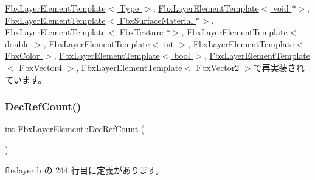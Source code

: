 \hyperlink{class_fbx_layer_element_template_a035bb7adbe8edf5a861d6154c7ebeb8b}{Fbx\+Layer\+Element\+Template$<$ Type $>$}, \hyperlink{class_fbx_layer_element_template_a035bb7adbe8edf5a861d6154c7ebeb8b}{Fbx\+Layer\+Element\+Template$<$ void $\ast$$>$}, \hyperlink{class_fbx_layer_element_template_a035bb7adbe8edf5a861d6154c7ebeb8b}{Fbx\+Layer\+Element\+Template$<$ Fbx\+Surface\+Material $\ast$$>$}, \hyperlink{class_fbx_layer_element_template_a035bb7adbe8edf5a861d6154c7ebeb8b}{Fbx\+Layer\+Element\+Template$<$ Fbx\+Texture $\ast$$>$}, \hyperlink{class_fbx_layer_element_template_a035bb7adbe8edf5a861d6154c7ebeb8b}{Fbx\+Layer\+Element\+Template$<$ double $>$}, \hyperlink{class_fbx_layer_element_template_a035bb7adbe8edf5a861d6154c7ebeb8b}{Fbx\+Layer\+Element\+Template$<$ int $>$}, \hyperlink{class_fbx_layer_element_template_a035bb7adbe8edf5a861d6154c7ebeb8b}{Fbx\+Layer\+Element\+Template$<$ Fbx\+Color $>$}, \hyperlink{class_fbx_layer_element_template_a035bb7adbe8edf5a861d6154c7ebeb8b}{Fbx\+Layer\+Element\+Template$<$ bool $>$}, \hyperlink{class_fbx_layer_element_template_a035bb7adbe8edf5a861d6154c7ebeb8b}{Fbx\+Layer\+Element\+Template$<$ Fbx\+Vector4 $>$}, \hyperlink{class_fbx_layer_element_template_a035bb7adbe8edf5a861d6154c7ebeb8b}{Fbx\+Layer\+Element\+Template$<$ Fbx\+Vector2 $>$}で再実装されています。

\mbox{\label{class_fbx_layer_element_a80d83d36366e1cf1f79b0e1479b5a692}} 
\subsubsection{\texorpdfstring{Dec\+Ref\+Count()}{DecRefCount()}}
{\footnotesize\ttfamily int Fbx\+Layer\+Element\+::\+Dec\+Ref\+Count (\begin{DoxyParamCaption}{ }\end{DoxyParamCaption})\hspace{0.3cm}{\ttfamily [inline]}}



 fbxlayer.\+h の 244 行目に定義があります。

\mbox{\label{class_fbx_layer_element_aa9a90be7d41c6b5e3b7813ea6967b8a4}} 
